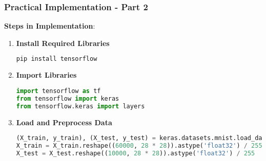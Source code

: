 \documentclass[aspectratio=169]{beamer}
\begin{document}
\begin{frame}[fragile]
    \frametitle{Practical Implementation - Part 2}
    \textbf{Steps in Implementation}:
    
    \begin{enumerate}
        \item \textbf{Install Required Libraries}
        \begin{lstlisting}[language=bash]
pip install tensorflow
        \end{lstlisting}

        \item \textbf{Import Libraries}
        \begin{lstlisting}[language=python]
import tensorflow as tf
from tensorflow import keras
from tensorflow.keras import layers
        \end{lstlisting}

        \item \textbf{Load and Preprocess Data}
        \begin{lstlisting}[language=python]
(X_train, y_train), (X_test, y_test) = keras.datasets.mnist.load_data()
X_train = X_train.reshape((60000, 28 * 28)).astype('float32') / 255
X_test = X_test.reshape((10000, 28 * 28)).astype('float32') / 255
        \end{lstlisting}
    \end{enumerate}
\end{frame}
\end{document}
